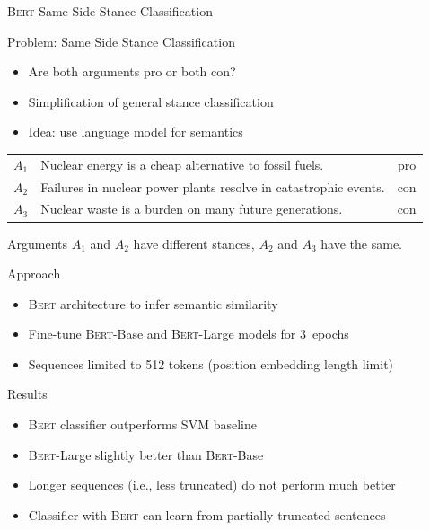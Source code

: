 \documentclass[english,handout]{mlutalk}
\newcommand{\Bert}{\textsc{Bert}\xspace}
\newcommand{\BertBase}{\textsc{Bert}-Base\xspace}
\newcommand{\BertLarge}{\textsc{Bert}-Large\xspace}
\begin{document}
\begin{frame}[allowframebreaks]{\Bert Same Side Stance Classification~\cite{OllingerDSBS2020}}
  
  \begin{block}{Problem: Same Side Stance Classification}
    \begin{itemize}
      \item Are both arguments pro or both con?
      \item Simplification of general stance classification
      \item Idea: use language model for semantics
    \end{itemize}
  \end{block}

  \begin{example}
    \footnotesize\centering\vspace*{1ex}
    \begin{tabular}{llc}
      \toprule
      \(A_1\) & Nuclear energy is a cheap alternative to fossil fuels. & pro \\
      \(A_2\) & Failures in nuclear power plants resolve in catastrophic events. & con \\
      \(A_3\) & Nuclear waste is a burden on many future generations. & con \\
      \bottomrule
    \end{tabular}

    \normalfont\raggedright\vspace*{1.5ex}
    Arguments \(A_1\) and \(A_2\) have different stances, \(A_2\) and \(A_3\) have the same.
  \end{example}
  
  \framebreak
  
  \begin{block}{Approach}
    \begin{itemize}
      \item \Bert architecture to infer semantic similarity
      \item Fine-tune \BertBase and \BertLarge models for 3~epochs
      \item Sequences limited to 512 tokens (position embedding length limit)
    \end{itemize}
  \end{block}

  \begin{block}{Results}
    \begin{itemize}
      \item \Bert classifier outperforms SVM baseline
      \item \BertLarge slightly better than \BertBase
      \item Longer sequences (i.e., less truncated) do not perform much better %
      \item Classifier with \Bert can learn from partially truncated sentences
    \end{itemize}
  \end{block}

\end{frame}
\end{document}
